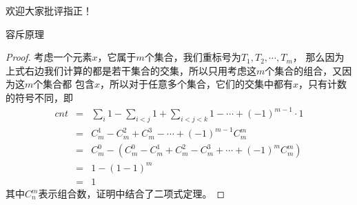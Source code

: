 \documentclass[allowframebreaks,9pt]{beamer}
\begin{document}
\begin{frame}

\begin{center}
\Huge{欢迎大家批评指正！}
\end{center}

\end{frame}

\begin{frame}{容斥原理}

\begin{proof}
考虑一个元素$x$，它属于$m$个集合，我们重标号为$T_1,T_2,\cdots,T_m$，
那么因为上式右边我们计算的都是若干集合的交集，所以只用考虑这$m$个集合的组合，又因为这$m$个集合都
包含$x$，所以对于任意多个集合，它们的交集中都有$x$，只有计数的符号不同，即
\begin{eqnarray*}
cnt & = & \sum_{i}{1} - \sum_{i<j}{1} + \sum_{i<j<k}{1} - \cdots + (-1)^{m-1} \cdot 1 \\
    & = & C_m^1 - C_m^2 + C_m^3 - \cdots + (-1)^{m-1} C_m^m \\
    & = & C_m^0 - \left(C_m^0 - C_m^1 + C_m^2 - C_m^3 + \cdots + (-1)^m C_m^m\right) \\
	& = & 1 - (1-1)^m \\
	& = & 1
\end{eqnarray*}
其中$C_n^m$表示组合数，证明中结合了二项式定理。
\end{proof}

\end{frame}
\end{document}
